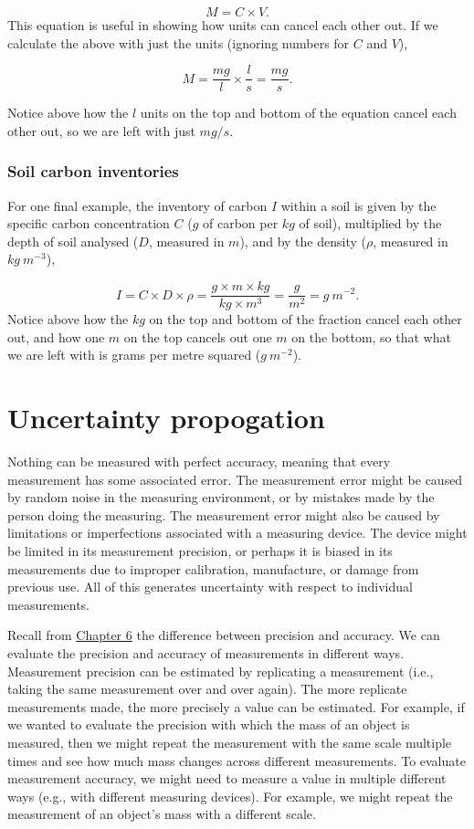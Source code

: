 \documentclass[
]{scrbook}
\begin{document}
\[M = C \times V.\]
This equation is useful in showing how units can cancel each other out.
If we calculate the above with just the units (ignoring numbers for \(C\) and \(V\)),

\[M = \frac{mg}{l} \times \frac{l}{s} = \frac{mg}{s}.\]

Notice above how the \(l\) units on the top and bottom of the equation cancel each other out, so we are left with just \(mg/s\).

\hypertarget{soil-carbon-inventories}{%
\subsection{Soil carbon inventories}\label{soil-carbon-inventories}}

For one final example, the inventory of carbon \(I\) within a soil is given by the specific carbon concentration \(C\) (\(g\) of carbon per \(kg\) of soil), multiplied by the depth of soil analysed (\(D\), measured in \(m\)), and by the density (\(\rho\), measured in \(kg\:m^{-3}\)),

\[I = C \times D \times \rho = \frac{g\times m \times kg}{kg \times m^{3}} = \frac{g}{m^{2}} = g\:m^{-2}.\]
Notice above how the \(kg\) on the top and bottom of the fraction cancel each other out, and how one \(m\) on the top cancels out one \(m\) on the bottom, so that what we are left with is grams per metre squared (\(g\:m^{-2}\)).

\hypertarget{Chapter_7}{%
\chapter{Uncertainty propogation}\label{Chapter_7}}

Nothing can be measured with perfect accuracy, meaning that every measurement has some associated error.
The measurement error might be caused by random noise in the measuring environment, or by mistakes made by the person doing the measuring.
The measurement error might also be caused by limitations or imperfections associated with a measuring device.
The device might be limited in its measurement precision, or perhaps it is biased in its measurements due to improper calibration, manufacture, or damage from previous use.
All of this generates uncertainty with respect to individual measurements.

Recall from \protect\hyperlink{Chapter_6}{Chapter 6} the difference between precision and accuracy.
We can evaluate the precision and accuracy of measurements in different ways.
Measurement precision can be estimated by replicating a measurement (i.e., taking the same measurement over and over again).
The more replicate measurements made, the more precisely a value can be estimated.
For example, if we wanted to evaluate the precision with which the mass of an object is measured, then we might repeat the measurement with the same scale multiple times and see how much mass changes across different measurements.
To evaluate measurement accuracy, we might need to measure a value in multiple different ways (e.g., with different measuring devices).
For example, we might repeat the measurement of an object's mass with a different scale.
\end{document}
